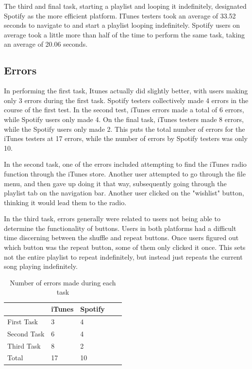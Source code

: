 \documentclass[12pt]{article}
\begin{document}
The third and final task, starting a playlist and looping it 
indefinitely, designated Spotify as the more efficient platform. 
ITunes testers took an average of 33.52 seconds to navigate to and 
start a playlist looping indefinitely. Spotify users on average 
took a little more than half of the time to perform the same task, 
taking an average of 20.06 seconds.

\subsection{Errors}

In performing the first task, Itunes actually did slightly better, with users making only 3 
errors during the first task. Spotify testers collectively made 4 
errors in the course of the first test. In the second test, iTunes 
errors made a total of 6 errors, while Spotify users only made 4. 
On the final task, iTunes testers made 8 errors, while the Spotify 
users only made 2. This puts the total number of errors for the 
iTunes testers at 17 errors, while the number of errors by Spotify 
testers was only 10.

In the second task, one of the errors included attempting to find 
the iTunes radio function through the iTunes store. Another user 
attempted to go through the file menu, and then gave up doing it 
that way, subsequently going through the playlist tab on the 
navigation bar. Another user clicked on the "wishlist" button, 
thinking it would lead them to the radio.

In the third task,  errors generally were related to users not 
being able to determine the functionality of buttons. Users in 
both platforms had a difficult time discerning between the shuffle 
and repeat buttons. Once users figured out which button was the 
repeat button, some of them only clicked it once. This sets not 
the entire playlist to repeat indefinitely, but instead just 
repeats the current song playing indefinitely.

\begin{table}[h]
\centering
\begin{tabular}{lllll}
\hline
            & iTunes & Spotify &  &  \\ \hline
First Task  & 3      & 4       &  &  \\
Second Task & 6      & 4       &  &  \\
Third Task  & 8      & 2       &  &  \\ \hline
Total       & 17     & 10      &  & 
\end{tabular}
\caption{Number of errors made during each task}
\end{table}
\end{document}
